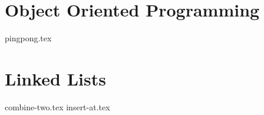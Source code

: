 \documentclass{exam}
\begin{document}
\section{Object Oriented Programming}
\begin{questions}
    {pingpong.tex} %
\end{questions}

\section{Linked Lists}
\begin{questions}
    {combine-two.tex}
    {insert-at.tex}
\end{questions}
\end{document}
